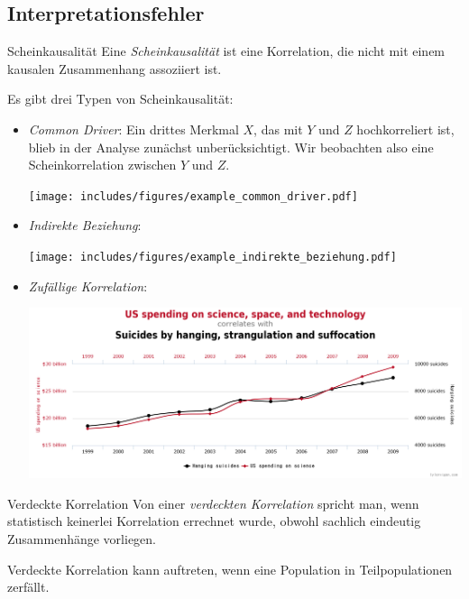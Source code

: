 \subsection{Interpretationsfehler}

\begin{defi}{Scheinkausalität}
    Eine \emph{Scheinkausalität} ist eine Korrelation, die nicht mit einem kausalen Zusammenhang assoziiert ist.

    Es gibt drei Typen von Scheinkausalität:
    \begin{itemize}
        \item \emph{Common Driver}: Ein drittes Merkmal $X$, das mit $Y$ und $Z$ hochkorreliert ist, blieb in der Analyse zunächst unberücksichtigt.
              Wir beobachten also eine Scheinkorrelation zwischen $Y$ und $Z$.

              \begin{center}
                  \texttt{[image: includes/figures/example\_common\_driver.pdf]}
              \end{center}
        \item \emph{Indirekte Beziehung}:

              \begin{center}
                  \texttt{[image: includes/figures/example\_indirekte\_beziehung.pdf]}
              \end{center}
        \item \emph{Zufällige Korrelation}:

              \begin{center}
                  \includegraphics[width=.9\textwidth]{includes/figures/example_zufaellige_korrelation.png}
              \end{center}
    \end{itemize}


\end{defi}

\begin{defi}{Verdeckte Korrelation}
    Von einer \emph{verdeckten Korrelation} spricht man, wenn statistisch keinerlei Korrelation errechnet wurde, obwohl sachlich eindeutig Zusammenhänge vorliegen.

    Verdeckte Korrelation kann auftreten, wenn eine Population in Teilpopulationen zerfällt.
\end{defi}
